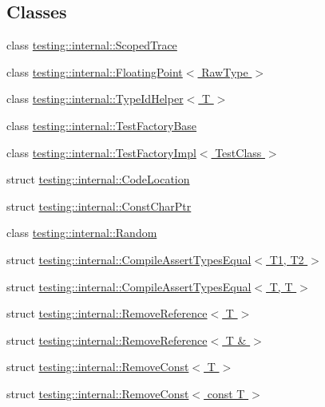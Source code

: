 \subsection*{Classes}
\begin{DoxyCompactItemize}
\item 
class \hyperlink{classtesting_1_1internal_1_1ScopedTrace}{testing\+::internal\+::\+Scoped\+Trace}
\item 
class \hyperlink{classtesting_1_1internal_1_1FloatingPoint}{testing\+::internal\+::\+Floating\+Point$<$ Raw\+Type $>$}
\item 
class \hyperlink{classtesting_1_1internal_1_1TypeIdHelper}{testing\+::internal\+::\+Type\+Id\+Helper$<$ T $>$}
\item 
class \hyperlink{classtesting_1_1internal_1_1TestFactoryBase}{testing\+::internal\+::\+Test\+Factory\+Base}
\item 
class \hyperlink{classtesting_1_1internal_1_1TestFactoryImpl}{testing\+::internal\+::\+Test\+Factory\+Impl$<$ Test\+Class $>$}
\item 
struct \hyperlink{structtesting_1_1internal_1_1CodeLocation}{testing\+::internal\+::\+Code\+Location}
\item 
struct \hyperlink{structtesting_1_1internal_1_1ConstCharPtr}{testing\+::internal\+::\+Const\+Char\+Ptr}
\item 
class \hyperlink{classtesting_1_1internal_1_1Random}{testing\+::internal\+::\+Random}
\item 
struct \hyperlink{structtesting_1_1internal_1_1CompileAssertTypesEqual}{testing\+::internal\+::\+Compile\+Assert\+Types\+Equal$<$ T1, T2 $>$}
\item 
struct \hyperlink{structtesting_1_1internal_1_1CompileAssertTypesEqual_3_01T_00_01T_01_4}{testing\+::internal\+::\+Compile\+Assert\+Types\+Equal$<$ T, T $>$}
\item 
struct \hyperlink{structtesting_1_1internal_1_1RemoveReference}{testing\+::internal\+::\+Remove\+Reference$<$ T $>$}
\item 
struct \hyperlink{structtesting_1_1internal_1_1RemoveReference_3_01T_01_6_01_4}{testing\+::internal\+::\+Remove\+Reference$<$ T \& $>$}
\item 
struct \hyperlink{structtesting_1_1internal_1_1RemoveConst}{testing\+::internal\+::\+Remove\+Const$<$ T $>$}
\item 
struct \hyperlink{structtesting_1_1internal_1_1RemoveConst_3_01const_01T_01_4}{testing\+::internal\+::\+Remove\+Const$<$ const T $>$}
\item 

\end{DoxyCompactItemize}
